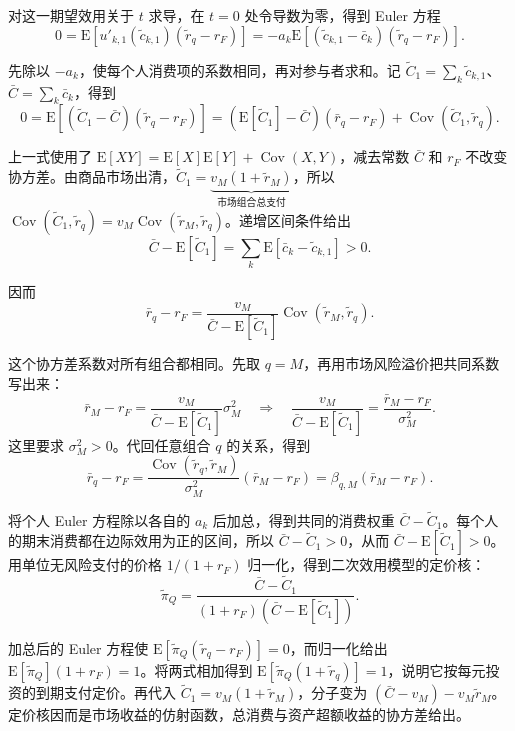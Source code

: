 \begin{solution}[label-content={证明（二次效用下的均衡定价）},blank-type=none]
对这一期望效用关于 $t$ 求导，在 $t=0$ 处令导数为零，得到 Euler 方程
\[
 0=\mathrm E[u'_{k,1}(\widetilde c_{k,1})(\widetilde r_q-r_F)]
 =-a_k\mathrm E[(\widetilde c_{k,1}-\bar c_k)(\widetilde r_q-r_F)].
\]

先除以 $-a_k$，使每个人消费项的系数相同，再对参与者求和。记 $\widetilde C_1=\sum_k\widetilde c_{k,1}$、$\bar C=\sum_k\bar c_k$，得到
\[
 0=\mathrm E[(\widetilde C_1-\bar C)(\widetilde r_q-r_F)]
 =(\mathrm E[\widetilde C_1]-\bar C)(\bar r_q-r_F)
 +\operatorname{Cov}(\widetilde C_1,\widetilde r_q).
\]

上一式使用了 $\mathrm E[XY]=\mathrm E[X]\mathrm E[Y]+\operatorname{Cov}(X,Y)$，减去常数 $\bar C$ 和 $r_F$ 不改变协方差。由商品市场出清，$\widetilde C_1=\underbrace{v_M(1+\widetilde r_M)}_{\text{市场组合总支付}}$，所以 $\operatorname{Cov}(\widetilde C_1,\widetilde r_q)=v_M\operatorname{Cov}(\widetilde r_M,\widetilde r_q)$。递增区间条件给出
\[
 \bar C-\mathrm E[\widetilde C_1]=\sum_k\mathrm E[\bar c_k-\widetilde c_{k,1}]>0.
\]

因而
\[
 \bar r_q-r_F=\frac{v_M}{\bar C-\mathrm E[\widetilde C_1]}
 \operatorname{Cov}(\widetilde r_M,\widetilde r_q).
\]

这个协方差系数对所有组合都相同。先取 $q=M$，再用市场风险溢价把共同系数写出来：
\[
 \bar r_M-r_F=\frac{v_M}{\bar C-\mathrm E[\widetilde C_1]}\sigma_M^2
 \quad\Longrightarrow\quad
 \frac{v_M}{\bar C-\mathrm E[\widetilde C_1]}=\frac{\bar r_M-r_F}{\sigma_M^2}.
\]
这里要求 $\sigma_M^2>0$。代回任意组合 $q$ 的关系，得到
\[
 \bar r_q-r_F
 =\frac{\operatorname{Cov}(\widetilde r_q,\widetilde r_M)}{\sigma_M^2}
  (\bar r_M-r_F)=\beta_{q,M}(\bar r_M-r_F).
\]
\end{solution}

将个人 Euler 方程除以各自的 $a_k$ 后加总，得到共同的消费权重 $\bar C-\widetilde C_1$。每个人的期末消费都在边际效用为正的区间，所以 $\bar C-\widetilde C_1>0$，从而 $\bar C-\mathrm E[\widetilde C_1]>0$。用单位无风险支付的价格 $1/(1+r_F)$ 归一化，得到二次效用模型的定价核：
\begin{equation*}
 \widetilde\pi_Q
 =\frac{\bar C-\widetilde C_1}{(1+r_F)(\bar C-\mathrm E[\widetilde C_1])}.
 \tag{13.II}\label{eq:wj-13-quadratic-kernel}
\end{equation*}

加总后的 Euler 方程使 $\mathrm E[\widetilde\pi_Q(\widetilde r_q-r_F)]=0$，而归一化给出 $\mathrm E[\widetilde\pi_Q](1+r_F)=1$。将两式相加得到 $\mathrm E[\widetilde\pi_Q(1+\widetilde r_q)]=1$，说明它按每元投资的到期支付定价。再代入 $\widetilde C_1=v_M(1+\widetilde r_M)$，分子变为 $(\bar C-v_M)-v_M\widetilde r_M$。定价核因而是市场收益的仿射函数，总消费与资产超额收益的协方差给出。

